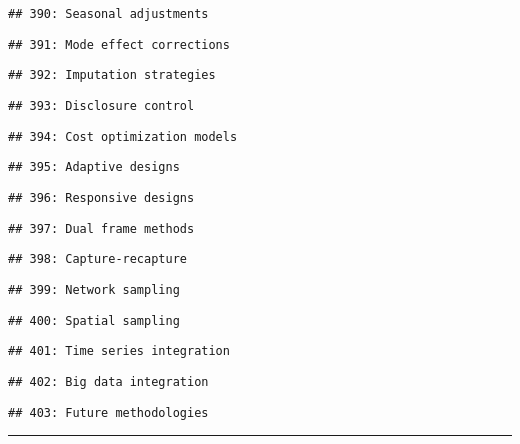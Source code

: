 \documentclass[
]{article}
\begin{document}
\begin{verbatim}
## 390: Seasonal adjustments
\end{verbatim}

\begin{verbatim}
## 391: Mode effect corrections
\end{verbatim}

\begin{verbatim}
## 392: Imputation strategies
\end{verbatim}

\begin{verbatim}
## 393: Disclosure control
\end{verbatim}

\begin{verbatim}
## 394: Cost optimization models
\end{verbatim}

\begin{verbatim}
## 395: Adaptive designs
\end{verbatim}

\begin{verbatim}
## 396: Responsive designs
\end{verbatim}

\begin{verbatim}
## 397: Dual frame methods
\end{verbatim}

\begin{verbatim}
## 398: Capture-recapture
\end{verbatim}

\begin{verbatim}
## 399: Network sampling
\end{verbatim}

\begin{verbatim}
## 400: Spatial sampling
\end{verbatim}

\begin{verbatim}
## 401: Time series integration
\end{verbatim}

\begin{verbatim}
## 402: Big data integration
\end{verbatim}

\begin{verbatim}
## 403: Future methodologies
\end{verbatim}

\begin{center}\rule{0.5\linewidth}{0.5pt}\end{center}
\end{document}
